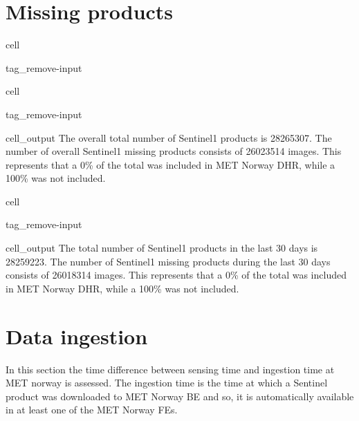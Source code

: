 \documentclass[letterpaper,10pt,english]{jupyterBook}
\begin{document}
\section{Missing products}
\label{\detokenize{S1_portals:missing-products}}
\begin{sphinxuseclass}{cell}
\begin{sphinxuseclass}{tag_remove-input}
\end{sphinxuseclass}
\end{sphinxuseclass}
\begin{sphinxuseclass}{cell}
\begin{sphinxuseclass}{tag_remove-input}\begin{sphinxVerbatimOutput}

\begin{sphinxuseclass}{cell_output}
\sphinxAtStartPar
The overall total number of Sentinel\sphinxhyphen{}1 products is 28265307. The number of overall Sentinel\sphinxhyphen{}1 missing products consists of 26023514 images. This represents that a 0\% of the total was included in MET Norway DHR, while a 100\% was not included.

\end{sphinxuseclass}\end{sphinxVerbatimOutput}

\end{sphinxuseclass}
\end{sphinxuseclass}
\begin{sphinxuseclass}{cell}
\begin{sphinxuseclass}{tag_remove-input}\begin{sphinxVerbatimOutput}

\begin{sphinxuseclass}{cell_output}
\sphinxAtStartPar
The total number of Sentinel\sphinxhyphen{}1 products in the last 30 days is 28259223. The number of Sentinel\sphinxhyphen{}1 missing products during the last 30 days consists of 26018314 images. This represents that a 0\% of the total was included in MET Norway DHR, while a 100\% was not included.

\end{sphinxuseclass}\end{sphinxVerbatimOutput}

\end{sphinxuseclass}
\end{sphinxuseclass}

\section{Data ingestion}
\label{\detokenize{S1_portals:data-ingestion}}
\sphinxAtStartPar
In this section the time difference between sensing time and ingestion time at MET norway is assessed. The ingestion time is the time at which a Sentinel product was downloaded to MET Norway BE and so, it is automatically available in at least one of the MET Norway FEs.
\end{document}
